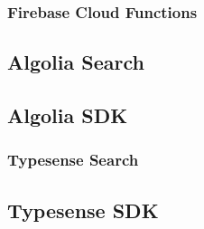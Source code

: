 \subsubsection{Firebase Cloud Functions}
\subsection{Algolia Search}
\subsection{Algolia SDK}

\subsubsection{Typesense Search}
\subsection{Typesense SDK}
